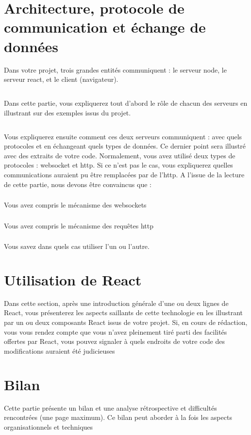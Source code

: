 \documentclass[a4paper]{article}
\begin{document}


\section{Architecture, protocole de communication et échange de données}

Dans votre projet, trois grandes entités communiquent : le serveur node, 
le serveur react, et le client (navigateur). 
\subsection{} Dans cette partie, vous expliquerez tout d’abord le rôle de chacun des serveurs en 
illustrant sur des exemples issus du projet. 
\subsection{} Vous expliquerez ensuite comment ces deux serveurs communiquent : avec quels 
protocoles et en échangeant quels types de données. Ce dernier point sera illustré 
avec des extraits de votre code. Normalement, vous avez utilisé deux types de 
protocoles : websocket et http. Si ce n’est pas le cas, vous expliquerez quelles 
communications auraient pu être remplacées par de l’http. A l’issue de la lecture de 
cette partie, nous devons être convaincus que :
\subsubsection{} Vous avez compris le mécanisme des websockets
\subsubsection{} Vous avez compris le mécanisme des requêtes http
\subsubsection{} Vous savez dans quels cas utiliser l’un ou l’autre.

\section{Utilisation de React}

Dans cette section, après une  introduction générale d’une ou deux lignes de React, vous présenterez les aspects saillants de cette technologie en les illustrant par un ou deux composants React issus de votre projet. Si, en cours de rédaction, vous vous rendez compte que vous n’avez pleinement tiré parti des facilités offertes par React, vous pouvez signaler à quels endroits de votre code des 
modifications auraient été judicieuses

\section{Bilan}

Cette partie présente un bilan et une analyse rétrospective et difficultés rencontrées 
(une page maximum). Ce bilan peut aborder à la fois les aspects organisationnels et 
techniques

    
\end{document}
